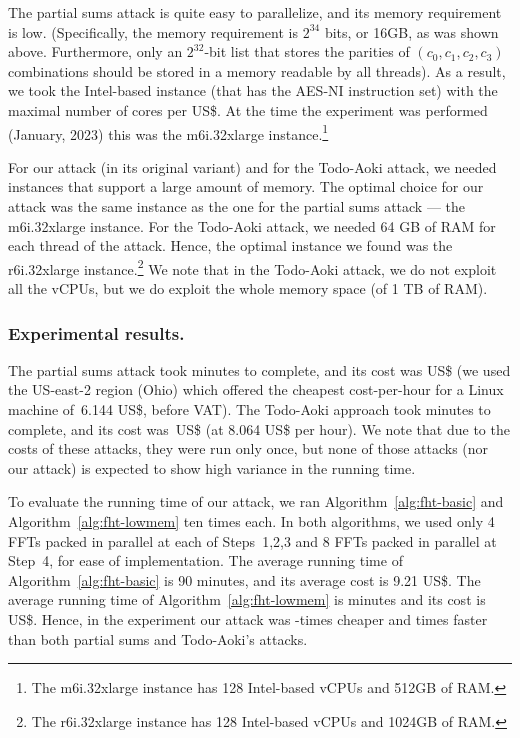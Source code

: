 The partial sums attack is quite easy to parallelize, and its memory requirement is low. (Specifically, the memory requirement is $2^{34}$ bits, or 16GB, as was shown above. Furthermore, only an $2^{32}$-bit list that stores the parities of $(c_0,c_1,c_2,c_3)$ combinations should be stored in a memory readable by all threads). As a result, we took the Intel-based instance (that has the AES-NI instruction set) with the maximal number of cores per US\$. At the time the experiment was performed (January, 2023) this was the m6i.32xlarge instance.\footnote{The m6i.32xlarge instance has 128 Intel-based vCPUs and 512GB of RAM.}

For our attack (in its original variant) and for the Todo-Aoki attack, we needed instances that support a large amount of memory. The optimal choice for our attack was the same instance as the one for the partial sums attack --- the m6i.32xlarge instance. For the Todo-Aoki attack, we needed 64 GB of RAM for each thread of the attack. Hence, the optimal instance we found was the r6i.32xlarge instance.\footnote{The r6i.32xlarge instance has 128 Intel-based vCPUs and 1024GB of RAM.} We note that in the Todo-Aoki attack, we do not exploit all the vCPUs, but we do exploit the whole memory space (of 1 TB of RAM).

\subsubsection{Experimental results.} The partial sums attack took \timePartial minutes to complete, and its cost was \pricePartial US\$ (we used the US-east-2 region (Ohio) which offered the cheapest cost-per-hour for a Linux machine of~6.144 US\$, before VAT). The Todo-Aoki approach took \timeFFT minutes to complete, and its cost was~\priceFFT US\$ (at 8.064 US\$ per hour).
We note that due to the costs of these attacks, they were run only once, but none of those attacks (nor our attack) is expected to show high variance in the running time.

To evaluate the running time of our attack, we ran Algorithm~\ref{alg:fht-basic} and Algorithm~\ref{alg:fht-lowmem} ten times each. In both algorithms, we used only 4 FFTs packed in parallel at each of Steps~1,2,3 and 8 FFTs packed in parallel at Step~4, for ease of implementation. The average running time of Algorithm~\ref{alg:fht-basic} is 90 minutes, and its average cost is 9.21 US\$. The average running time of Algorithm~\ref{alg:fht-lowmem} is \timeOur minutes and its cost is \priceOur US\$. Hence, in the experiment our attack was \cheapup-times cheaper and \speedup times faster than both partial sums and Todo-Aoki's attacks. 


